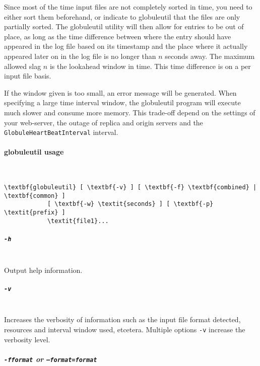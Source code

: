 \documentclass[10pt,a4paper]{article}
\makeatletter
\newenvironment{p}{\@open{P}{}}{\@close{P}}
\newenvironment{p}{}{\par}
\makeatother
\begin{document}
\begin{p}
Since most of the time input files are not completely sorted in time, you need
to either sort them beforehand, or indicate to globuleutil that the files are
only partially sorted.
The globuleutil utility will then allow for entries to be out of place, as
long as the time difference between where the entry should have appeared in
the log file based on its timestamp and the place where it actually appeared
later on in the log file is no longer than $n$ seconds away.  The maximum
allowed slag $n$ is the lookahead window in time.  This time difference is on
a per input file basis.
\end{p}

\begin{p}
If the window given is too small, an error message will be generated.  When
specifying a large time interval window, the globuleutil program will execute
much slower and consume more memory.  This trade-off depend on the settings of
your web-server, the outage of replica and origin servers and the
\texttt{GlobuleHeartBeatInterval} interval.
\end{p}

\paragraph*{globuleutil usage}~\\

\begin{Verbatim}
\textbf{globuleutil} [ \textbf{-v} ] [ \textbf{-f} \textbf{combined} | \textbf{common} ]
            [ \textbf{-w} \textit{seconds} ] [ \textbf{-p} \textit{prefix} ]
            \textit{file1}...
\end{Verbatim}

\subparagraph*{\texttt{-h}}~\\

\begin{p}
Output help information.
\end{p}

\subparagraph*{\texttt{-v}}~\\

\begin{p}
Increases the verbosity of information such as the input file format detected,
resources and interval window used, etcetera.  Multiple options \texttt{-v}
increase the verbosity level.
\end{p}

\subparagraph*{\texttt{-f\textit{format}} or
               \texttt{--format=\textit{format}}}~\\
\end{document}
